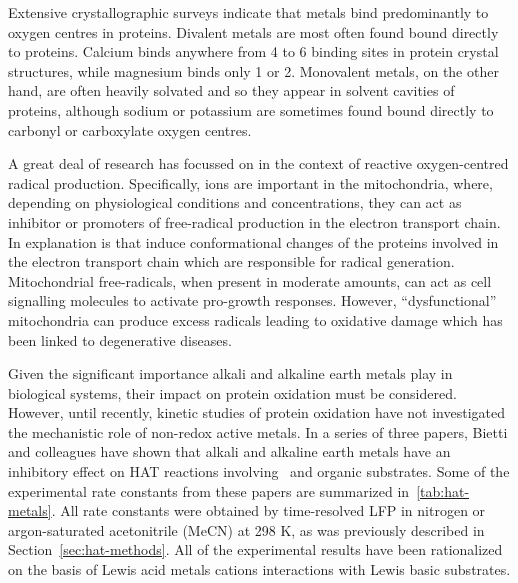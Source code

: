 Extensive crystallographic surveys indicate that metals bind predominantly to oxygen centres in proteins.\cite{Harding1999, Harding2004, Hsin2008} Divalent metals are most often found bound directly to proteins. Calcium binds anywhere from 4 to 6 binding sites in protein crystal structures, while magnesium binds only 1 or 2. Monovalent metals, on the other hand, are often heavily solvated and so they appear in solvent cavities of proteins, although sodium or potassium are sometimes found bound directly to carbonyl or carboxylate oxygen centres.\cite{Harding2010}

A great deal of research has focussed on  in the context of reactive oxygen-centred radical production.\cite{Goerlach2015} Specifically,  ions are important in the mitochondria, where, depending on physiological conditions and concentrations, they can act as inhibitor or promoters of free-radical production in the electron transport chain.\cite{AdamVizi2010} In explanation is that  induce conformational changes of the proteins involved in the electron transport chain which are responsible for radical generation.\cite{Brookes2004} Mitochondrial free-radicals, when present in moderate amounts, can act as cell signalling molecules to activate pro-growth responses.\cite{Sullivan2014} However, ``dysfunctional'' mitochondria can produce excess radicals leading to oxidative damage which has been linked to degenerative diseases.

Given the significant importance alkali and alkaline earth metals play in biological systems, their impact on protein oxidation must be considered. However, until recently, kinetic studies of protein oxidation have not investigated the mechanistic role of non-redox active metals. In a series of three papers,\cite{Salamone2013a, Salamone2015metals, Salamone2016} Bietti and colleagues have shown that alkali and alkaline earth metals have an inhibitory effect on HAT reactions involving \cumo\ and organic substrates. Some of the experimental rate constants from these papers are summarized in~\ref{tab:hat-metals}. All rate constants were obtained by time-resolved LFP in nitrogen or argon-saturated acetonitrile (MeCN) at 298 K, as was previously described in Section~\ref{sec:hat-methods}. All of the experimental results have been rationalized on the basis of Lewis acid metals cations interactions with Lewis basic substrates.

